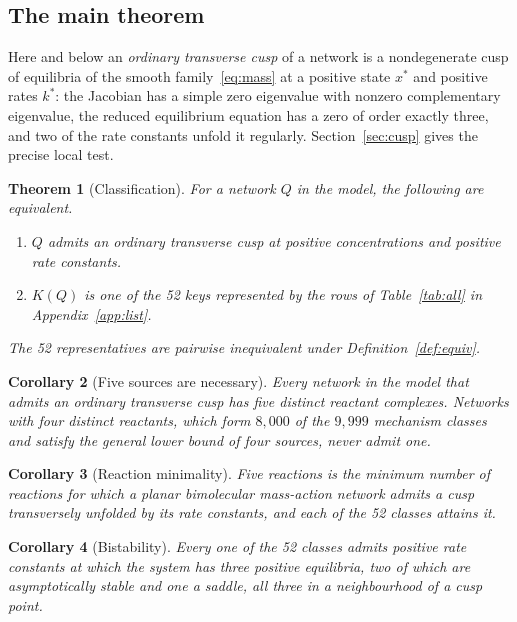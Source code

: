 \documentclass[11pt,a4paper]{article}
\theoremstyle{plain}
\newtheorem{theorem}{Theorem}[section]
\newtheorem{corollary}[theorem]{Corollary}
\theoremstyle{definition}
\theoremstyle{remark}
\numberwithin{equation}{section}
\begin{document}
\subsection{The main theorem}
Here and below an \emph{ordinary transverse cusp} of a network is a nondegenerate cusp of equilibria of the smooth family~\eqref{eq:mass} at a positive state $x^*$ and positive rates $k^*$: the Jacobian has a simple zero eigenvalue with nonzero complementary eigenvalue, the reduced equilibrium equation has a zero of order exactly three, and two of the rate constants unfold it regularly. Section~\ref{sec:cusp} gives the precise local test.

\begin{theorem}[Classification]\label{thm:main}
For a network $Q$ in the model, the following are equivalent.
\begin{enumerate}[label=\textup{(\roman*)}]
\item $Q$ admits an ordinary transverse cusp at positive concentrations and positive rate constants.
\item $K(Q)$ is one of the 52 keys represented by the rows of Table~\ref{tab:all} in Appendix~\ref{app:list}.
\end{enumerate}
The 52 representatives are pairwise inequivalent under Definition~\ref{def:equiv}.
\end{theorem}

\begin{corollary}[Five sources are necessary]\label{cor:five-sources}
Every network in the model that admits an ordinary transverse cusp has five distinct reactant complexes. Networks with four distinct reactants, which form $8{,}000$ of the $9{,}999$ mechanism classes and satisfy the general lower bound of four sources, never admit one.
\end{corollary}

\begin{corollary}[Reaction minimality]\label{cor:minimal}
Five reactions is the minimum number of reactions for which a planar bimolecular mass-action network admits a cusp transversely unfolded by its rate constants, and each of the 52 classes attains it.
\end{corollary}

\begin{corollary}[Bistability]\label{cor:bistable}
Every one of the 52 classes admits positive rate constants at which the system has three positive equilibria, two of which are asymptotically stable and one a saddle, all three in a neighbourhood of a cusp point.
\end{corollary}
\end{document}

